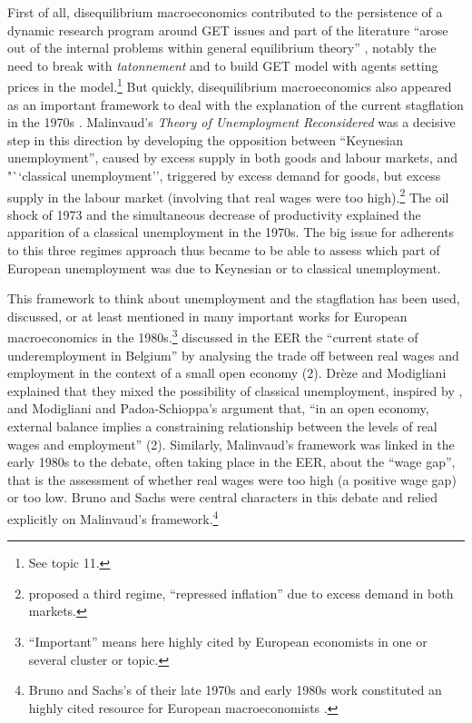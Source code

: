 \documentclass[]{elsarticle} %
\begin{document}
First of all, disequilibrium macroeconomics contributed to the
persistence of a dynamic research program around GET issues and part of
the literature ``arose out of the internal problems within general
equilibrium theory'' \citep[105]{backhouseboianovski2013}, notably the
need to break with \emph{tatonnement} and to build GET model with agents
setting prices in the model.\footnote{See topic 11.} But quickly,
disequilibrium macroeconomics also appeared as an important framework to
deal with the explanation of the current stagflation in the 1970s
\citep[chapter 8]{backhouseboianovski2013}. Malinvaud's \emph{Theory of
Unemployment Reconsidered} \citeyearpar{malinvaud1977} was a decisive
step in this direction by developing the opposition between ``Keynesian
unemployment'', caused by excess supply in both goods and labour
markets, and "``classical unemployment'', triggered by excess demand for
goods, but excess supply in the labour market (involving that real wages
were too high).\footnote{\citet{malinvaud1977} proposed a third regime,
  ``repressed inflation'' due to excess demand in both markets.} The oil
shock of 1973 and the simultaneous decrease of productivity explained
the apparition of a classical unemployment in the 1970s. The big issue
for adherents to this three regimes approach thus became to be able to
assess which part of European unemployment was due to Keynesian or to
classical unemployment.

This framework to think about unemployment and the stagflation has been
used, discussed, or at least mentioned in many important works for
European macroeconomics in the 1980s.\footnote{``Important'' means here
  highly cited by European economists in one or several cluster or
  topic.} \citet{dreze1981} discussed in the EER the ``current state of
underemployment in Belgium'' by analysing the trade off between real
wages and employment in the context of a small open economy (2). Drèze
and Modigliani explained that they mixed the possibility of classical
unemployment, inspired by \citet{malinvaud1977}, and Modigliani and
Padoa-Schioppa's argument that, ``in an open economy, external balance
implies a constraining relationship between the levels of real wages and
employment'' (2). Similarly, Malinvaud's framework was linked in the
early 1980s to the debate, often taking place in the EER, about the
``wage gap'', that is the assessment of whether real wages were too high
(a positive wage gap) or too low. Bruno and Sachs were central
characters in this debate and relied explicitly on Malinvaud's
framework.\footnote{Bruno and Sachs's \citeyearpar{brunosachs1985} of
  their late 1970s and early 1980s work constituted an highly cited
  resource for European macroeconomists \citep[see also][section
  3]{goutsmedt2021}.}
\end{document}
